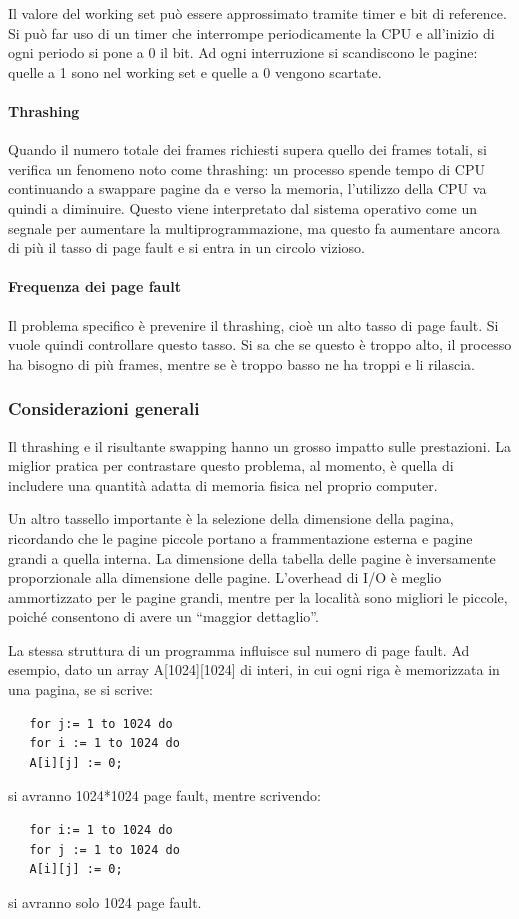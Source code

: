 \documentclass[a4paper]{article}
\begin{document}
Il valore del working set può essere approssimato tramite timer e bit di reference. Si può far uso di un timer che interrompe periodicamente la CPU e all'inizio di ogni periodo si pone a 0 il bit. Ad ogni interruzione si scandiscono le pagine: quelle a 1 sono nel working set e quelle a 0 vengono scartate.

\paragraph{Thrashing} Quando il numero totale dei frames richiesti supera quello dei frames totali, si verifica un fenomeno noto come thrashing: un processo spende tempo di CPU continuando a swappare pagine da e verso la memoria, l'utilizzo della CPU va quindi a diminuire. Questo viene interpretato dal sistema operativo come un segnale per aumentare la multiprogrammazione, ma questo fa aumentare ancora di più il tasso di page fault e si entra in un circolo vizioso.

\paragraph{Frequenza dei page fault}
Il problema specifico è prevenire il thrashing, cioè un alto tasso di page fault. Si vuole quindi controllare questo tasso. Si sa che se questo è troppo alto, il processo ha bisogno di più frames, mentre se è troppo basso ne ha troppi e li rilascia.

\subsubsection{Considerazioni generali}
Il thrashing e il risultante swapping hanno un grosso impatto sulle prestazioni. La miglior pratica per contrastare questo problema, al momento, è quella di includere una quantità adatta di memoria fisica nel proprio computer.

Un altro tassello importante è la selezione della dimensione della pagina, ricordando che le pagine piccole portano a frammentazione esterna e pagine grandi a quella interna. La dimensione della tabella delle pagine è inversamente proporzionale alla dimensione delle pagine. L'overhead di I/O è meglio ammortizzato per le pagine grandi, mentre per la località sono migliori le piccole, poiché consentono di avere un ``maggior dettaglio''.

La stessa struttura di un programma influisce sul numero di page fault. Ad esempio, dato un array A[1024][1024] di interi, in cui ogni riga è memorizzata in una pagina, se si scrive:
\begin{Verbatim}
   for j:= 1 to 1024 do
   for i := 1 to 1024 do
   A[i][j] := 0;
\end{Verbatim}
si avranno 1024*1024 page fault, mentre scrivendo:
\begin{Verbatim}
   for i:= 1 to 1024 do
   for j := 1 to 1024 do
   A[i][j] := 0;
\end{Verbatim}
si avranno solo 1024 page fault.
\end{document}
